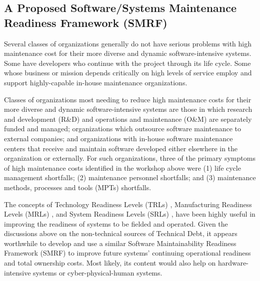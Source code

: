\subsection{A Proposed Software/Systems Maintenance Readiness Framework (SMRF)}
\label{subsec:smrf}
Several classes of organizations generally do not have serious problems with high maintenance cost for their more diverse and dynamic software-intensive systems. Some have developers who continue with the project through its life cycle. Some whose business or mission depends critically on high levels of service employ and support highly-capable in-house maintenance organizations.

Classes of organizations most needing to reduce high maintenance costs for their more diverse and dynamic software-intensive systems are those in which research and development (R\&D) and operations and maintenance (O\&M) are separately funded and managed; organizations which outsource software maintenance to external companies; and organizations with in-house software maintenance centers that receive and maintain software developed either elsewhere in the organization or externally. For such organizations, three of the primary symptoms of high maintenance costs
identified in the workshop above were
(1) life cycle management shortfalls; (2) maintenance personnel shortfalls; and (3) maintenance methods, processes and tools (MPTs) shortfalls.



The concepts of Technology Readiness Levels (TRLs) \citep{dod2011technology}, Manufacturing Readiness Levels (MRLs) \citep{cundiff2003manufacturing}, and System Readiness Levels (SRLs) \citep{sauser2006trl,sauser2007system}, have been highly useful in improving the readiness of systems to be fielded and operated.  Given the discussions above on the non-technical sources of Technical Debt, it appears worthwhile to develop and use a similar Software Maintainability Readiness Framework (SMRF) to improve future systems' continuing operational readiness and total ownership costs. Most likely, its content would also help on hardware-intensive systems or cyber-physical-human systems.





